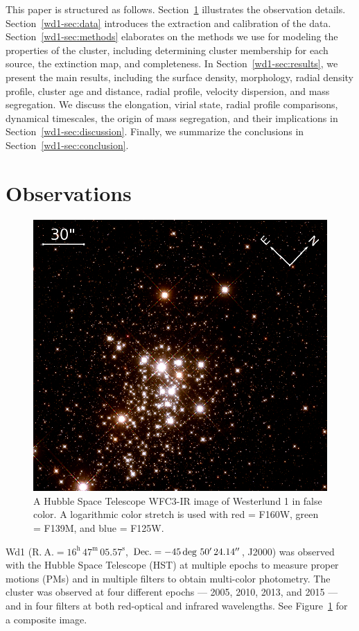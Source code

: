 \documentclass[12pt]{ucsddissertation}
\begin{document}
\begin{CJK*}{UTF8}{gbsn}
This paper is structured as follows. Section~\ref{wd1-sec:observations} illustrates the observation details. Section~\ref{wd1-sec:data} introduces the extraction and calibration of the data.
Section~\ref{wd1-sec:methods} elaborates on the methods we use for modeling the properties of the cluster, including determining cluster membership for each source, the extinction map, and completeness. In Section~\ref{wd1-sec:results}, we present the main results, including the surface density, morphology, radial density profile, cluster age and distance, radial profile, velocity dispersion, and mass segregation. We discuss the elongation, virial state, radial profile comparisons, dynamical timescales, the origin of mass segregation, and their implications in Section~\ref{wd1-sec:discussion}. Finally, we summarize the conclusions in Section~\ref{wd1-sec:conclusion}.


\section{Observations}
\label{wd1-sec:observations}

\begin{figure}[htb!]
\centering
\includegraphics[width=0.7\linewidth]{figures/chapter2/wd1_rgb.png}
\caption[Hubble Space Telescope infrared image of Westerlund 1]{A Hubble Space Telescope WFC3-IR image of Westerlund 1 in false color. A logarithmic color stretch is used with red = F160W, green = F139M, and blue = F125W.}
\label{fig:wd1_rgb}
\end{figure}

Wd1 ($\mathrm{R.~A.}=16^\mathrm{h}\,47^\mathrm{m}\,05.57^\mathrm{s}$, $\mathrm{Dec.}=-45\deg\,50\mbox{$^\prime$}\,24.14\mbox{$^{\prime\prime}$}$, J2000) was observed with the Hubble Space Telescope (HST) at multiple epochs to measure proper motions (PMs) and in multiple filters to obtain multi-color photometry. 
The cluster was observed at four different epochs --- 2005, 2010, 2013, and 2015 --- and in four filters at both red-optical and infrared wavelengths. 
See Figure~\ref{fig:wd1_rgb} for a composite image. 


\end{CJK*}
\end{document}
